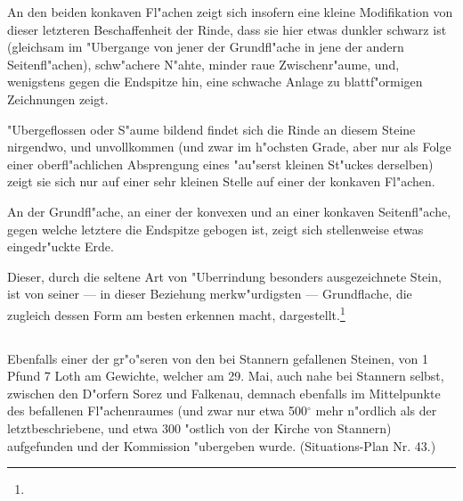 \documentclass[a4paper, 11pt, oneside, german]{article}
\begin{document}
An den beiden konkaven Fl"achen zeigt sich insofern eine kleine Modifikation von dieser letzteren Beschaffenheit der Rinde, dass sie hier etwas dunkler schwarz ist (gleichsam im "Ubergange von jener der Grundfl"ache in jene der andern Seitenfl"achen), schw"achere N"ahte, minder raue Zwischenr"aume, und, wenigstens gegen die Endspitze hin, eine schwache Anlage zu blattf"ormigen Zeichnungen zeigt.

"Ubergeflossen oder S"aume bildend findet sich die Rinde an diesem Steine nirgendwo, und unvollkommen (und zwar im h"ochsten Grade, aber nur als Folge einer oberfl"achlichen Absprengung eines "au"serst kleinen St"uckes derselben) zeigt sie sich nur auf einer sehr kleinen Stelle auf einer der konkaven Fl"achen.

An der Grundfl"ache, an einer der konvexen und an einer konkaven Seitenfl"ache, gegen welche letztere die Endspitze gebogen ist, zeigt sich stellenweise etwas eingedr"uckte Erde.

Dieser, durch die seltene Art von "Uberrindung besonders ausgezeichnete Stein, ist von seiner --- in dieser Beziehung merkw"urdigsten --- Grundflache, die zugleich dessen Form am besten erkennen macht, dargestellt.\footnote{}

\subsection{}
\paragraph{}
Ebenfalls einer der gr"o"seren von den bei Stannern gefallenen Steinen, von 1 Pfund 7 Loth am Gewichte, welcher am 29. Mai, auch nahe bei Stannern selbst, zwischen den D"orfern Sorez und Falkenau, demnach ebenfalls im Mittelpunkte des befallenen Fl"achenraumes (und zwar nur etwa 500$^{\circ}$ mehr n"ordlich als der letztbeschriebene, und etwa 300 "ostlich von der Kirche von Stannern) aufgefunden und der Kommission "ubergeben wurde. (Situations-Plan Nr. 43.)
\end{document}
